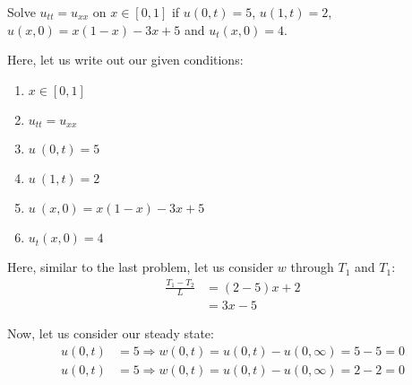 \item Solve $u_{tt} = u_{xx}$ on $x \in [0, 1]$ if $u(0, t) = 5$, $u(1, t) = 2$, $u(x, 0) = x(1 - x) - 3x + 5$ and $u_t(x, 0) = 4$.

Here, let us write out our given conditions:
\begin{enumerate}
  \item $x \in [0, 1]$
  \item $u_{tt} = u_{xx}$
  \item $u\ (0, t) = 5$
  \item $u\ (1, t) = 2$
  \item $u\ (x, 0) = x(1 - x) - 3x + 5$
  \item $u_t(x, 0) = 4$
\end{enumerate}

Here, similar to the last problem, let us consider $w$ through $T_1$ and $T_1$:
%
\begin{align}
  \frac{T_1 - T_2}{L} & = (2 - 5)x + 2\\
  & = 3x - 5
\end{align}

Now, let us consider our steady state:
%
\begin{align}
  u(0, t) & = 5 \Rightarrow w(0, t) = u(0, t) - u(0, \infty) = 5 - 5 = 0\\
  u(0, t) & = 5 \Rightarrow w(0, t) = u(0, t) - u(0, \infty) = 2 - 2 = 0
\end{align}


